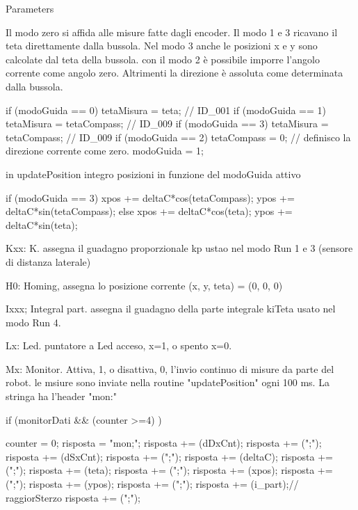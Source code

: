 \begin{DoxyParams}{Parameters}
\begin{DoxyVerb}
        Il modo zero si affida alle misure fatte dagli encoder.
        Il modo 1 e 3 ricavano il teta direttamente dalla bussola. Nel modo 3 anche le posizioni x e y 
        sono calcolate dal teta della bussola.
        con il modo 2 è possibile imporre l'angolo corrente come angolo zero. Altrimenti la direzione è
        assoluta come determinata dalla bussola.

        if (modoGuida == 0) tetaMisura = teta;          // ID_001               
        if (modoGuida == 1) tetaMisura = tetaCompass;   // ID_009               
        if (modoGuida == 3) tetaMisura = tetaCompass;   // ID_009               
        if (modoGuida == 2) {                   
            tetaCompass = 0;    // definisco la direzione corrente come zero.                   
            modoGuida   = 1;
            }

        in updatePosition integro posizioni in funzione del modoGuida attivo

        if (modoGuida == 3) {                   
            xpos    +=  deltaC*cos(tetaCompass);                    
            ypos    +=  deltaC*sin(tetaCompass);                    
        }
        else{                   
            xpos    +=  deltaC*cos(teta);                   
            ypos    +=  deltaC*sin(teta);                   
        }

Kxx: K. assegna il guadagno proporzionale kp ustao nel modo Run 1 e 3 (sensore di distanza laterale)

H0:     Homing, assegna lo posizione corrente (x, y, teta) = (0, 0, 0) 

Ixxx;   Integral part. assegna il guadagno della parte integrale kiTeta usato nel modo Run 4.

Lx:     Led. puntatore a Led acceso, x=1, o spento x=0.

Mx:     Monitor. Attiva, 1, o disattiva, 0, l'invio continuo di misure da parte del robot.
        le msiure sono inviate nella routine "updatePosition" ogni 100 ms.
        La stringa ha l'header "mon:"

        if (monitorDati && (counter >=4) ){
        counter = 0;
        risposta  = "mon;";
        risposta += (dDxCnt);
        risposta += (";");
        risposta += (dSxCnt);
        risposta += (";");
        risposta += (deltaC);
        risposta += (";");
        risposta += (teta);
        risposta += (";");
        risposta += (xpos);
        risposta += (";");
        risposta += (ypos);
        risposta += (";");
        risposta += (i_part);// raggiorSterzo
        risposta += (";");

}
\end{DoxyVerb}
\end{DoxyParams}
